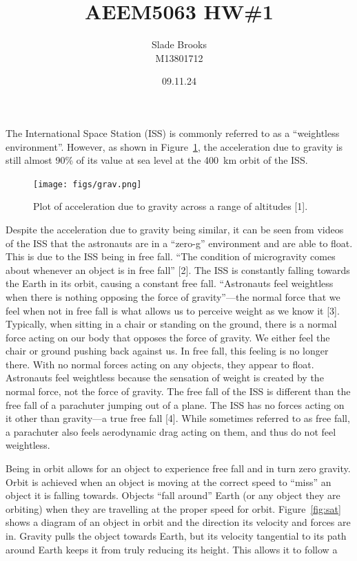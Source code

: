 \documentclass[12 pt]{article}
\title{AEEM5063 HW\#1}
\date{09.11.24}
\author{Slade Brooks \\ M13801712}
\begin{document}
\maketitle

The International Space Station (ISS) is commonly referred to as a ``weightless environment''. However, as shown in
Figure~\ref{fig:grav}, the acceleration due to gravity is still almost 90\% of its value at sea level at the 400~km
orbit of the ISS.
\begin{figure}[H]
    \centering
    \texttt{[image: figs/grav.png]}
    \caption{Plot of acceleration due to gravity across a range of altitudes [1].}
    \label{fig:grav}
\end{figure}
Despite the acceleration due to gravity being similar, it can be seen from videos of the ISS that the astronauts are in
a ``zero-g'' environment and are able to float. This is due to the ISS being in free fall. ``The condition of
microgravity comes about whenever an object is in free fall'' [2]. The ISS is constantly falling towards the Earth in
its orbit, causing a constant free fall. ``Astronauts feel weightless when there is nothing opposing the force of
gravity''---the normal force that we feel when not in free fall is what allows us to perceive weight as we know it [3].
Typically, when sitting in a chair or standing on the ground, there is a normal force acting on our body that opposes
the force of gravity. We either feel the chair or ground pushing back against us. In free fall, this feeling is no
longer there. With no normal forces acting on any objects, they appear to float. Astronauts feel weightless because the
sensation of weight is created by the normal force, not the force of gravity. The free fall of the ISS is different than
the free fall of a parachuter jumping out of a plane. The ISS has no forces acting on it other than gravity---a true
free fall [4]. While sometimes referred to as free fall, a parachuter also feels aerodynamic drag acting on them, and thus
do not feel weightless. \par
Being in orbit allows for an object to experience free fall and in turn zero gravity. Orbit is achieved when an object
is moving at the correct speed to ``miss'' an object it is falling towards. Objects ``fall around'' Earth (or any object
they are orbiting) when they are travelling at the proper speed for orbit. Figure~\ref{fig:sat} shows a diagram of an
object in orbit and the direction its velocity and forces are in. Gravity pulls the object towards Earth, but its
velocity tangential to its path around Earth keeps it from truly reducing its height. This allows it to follow a
\end{document}
